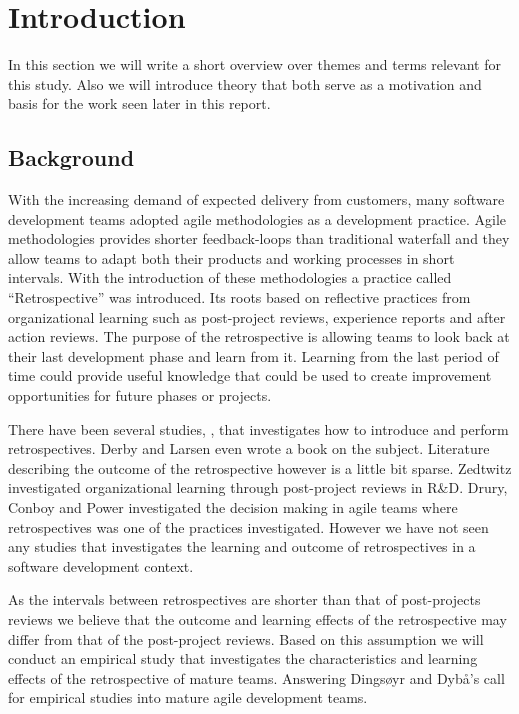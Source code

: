 \chapter{Introduction}

In this section we will write a short overview over themes and terms relevant for this study. Also we will introduce theory that both serve as a motivation and basis for the work seen later in this report.

\section{Background}
With the increasing demand of expected delivery from customers, many software development teams adopted agile methodologies as a development practice. Agile methodologies provides shorter feedback-loops than traditional waterfall and they allow teams to adapt both their products and working processes in short intervals. With the introduction of these methodologies a practice called ``Retrospective'' was introduced. Its roots based on reflective practices from organizational learning such as post-project reviews, experience reports and after action reviews. The purpose of the retrospective is allowing teams to look back at their last development phase and learn from it. Learning from the last period of time could provide useful knowledge that could be used to create improvement opportunities for future phases or projects. 

There have been several studies, \cite{Dingsoyr2004, Zedtwitz2002, bjornson2009, Hanssen2003, Dingsoyr2007, Bjarnason2012, Dingsoyr2003, Moe2001}, that investigates how to introduce and perform retrospectives. Derby and Larsen \cite{Larsen2006} even wrote a book on the subject. Literature describing the outcome of the retrospective however is a little bit sparse. Zedtwitz \cite{Zedtwitz2002} investigated organizational learning through post-project reviews in R\&D. Drury, Conboy and Power \cite{Drury2012} investigated the decision making in agile teams where retrospectives was one of the practices investigated. However we have not seen any studies that investigates the learning and outcome of retrospectives in a software development context. 

As the intervals between retrospectives are shorter than that of post-projects reviews we believe that the outcome and learning effects of the retrospective may differ from that of the post-project reviews. Based on this assumption we will conduct an empirical study that investigates the characteristics and learning effects of the retrospective of mature teams. Answering Dingsøyr and Dybå's call \cite{Dyba2008} for empirical studies into mature agile development teams. 

